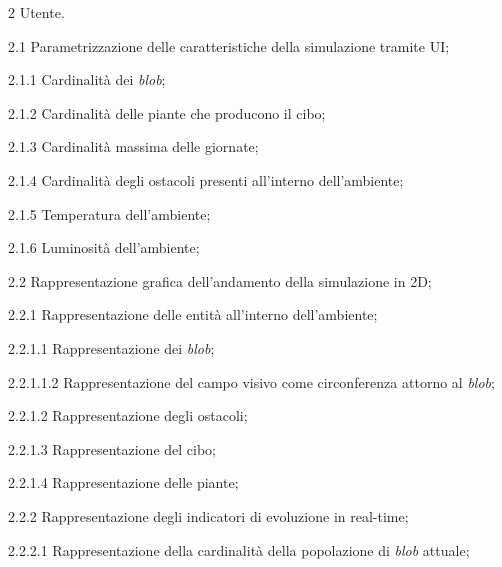 \begin{myEnumerate}
    \item[2] Utente.
    \begin{myEnumerate}[label*=\arabic*.]
        \item[2.1] Parametrizzazione delle caratteristiche della simulazione tramite UI;
        \begin{myEnumerate}[label*=\arabic*.]
            \item[2.1.1] Cardinalità dei \textit{blob};
            \item[2.1.2] Cardinalità delle piante che producono il cibo;
            \item[2.1.3] Cardinalità massima delle giornate;
            \item[2.1.4] Cardinalità degli ostacoli presenti all'interno dell'ambiente;
            \item[2.1.5] Temperatura dell'ambiente;
            \item[2.1.6] Luminosità dell'ambiente;
        \end{myEnumerate}
        \item[2.2] Rappresentazione grafica dell'andamento della simulazione in 2D;
        \begin{myEnumerate}[label*=\arabic*.]
            \item[2.2.1] Rappresentazione delle entità all'interno dell'ambiente;
            \begin{myEnumerate}[label*=\arabic*.]
                \item[2.2.1.1] Rappresentazione dei \textit{blob};
		        \begin{myEnumerate}[label*=\arabic*.]
			        \item[2.2.1.1.2] Rappresentazione del campo visivo come circonferenza attorno al \textit{blob};
		        \end{myEnumerate}
                \item[2.2.1.2] Rappresentazione degli ostacoli;
                \item[2.2.1.3] Rappresentazione del cibo;
		\item[2.2.1.4] Rappresentazione delle piante;
            \end{myEnumerate}
            \item[2.2.2] Rappresentazione degli indicatori di evoluzione in real-time;
            \begin{myEnumerate}[label*=\arabic*.]
                \item[2.2.2.1] Rappresentazione della cardinalità della popolazione di \textit{blob} attuale;

\end{myEnumerate}
\end{myEnumerate}
\end{myEnumerate}
\end{myEnumerate}
